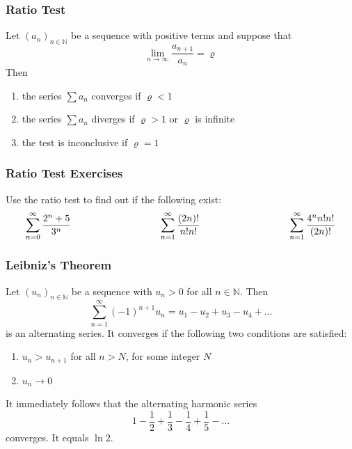 \documentclass[xcolor=dvipsnames]{beamer}
\begin{document}
\begin{frame}
  \frametitle{Ratio Test}
Let $\left(a_{n}\right)_{n\in\mathbb{N}}$ be a sequence with
positive terms and suppose that
\begin{equation}
  \label{eq:lahyaxee}
  \lim_{n\rightarrow\infty}\frac{a_{n+1}}{a_{n}}=\varrho
\end{equation}
Then
\begin{enumerate}
\item the series $\sum{}a_{n}$ converges if $\varrho<1$
\item the series $\sum{}a_{n}$ diverges if $\varrho>1$ or
  $\varrho$ is infinite
\item the test is inconclusive if $\varrho=1$
\end{enumerate}
\end{frame}

\begin{frame}
  \frametitle{Ratio Test Exercises}
  {\ubung} Use the ratio test to find out if the following exist:
  \begin{equation}
    \label{eq:uaxahphe}
    \begin{array}{ccccc}
      \displaystyle \sum_{n=0}^{\infty}\frac{2^{n}+5}{3^{n}} & \hspace{1in} & \displaystyle \sum_{n=1}^{\infty}\frac{(2n)!}{n!n!} & \hspace{1in} & \displaystyle \sum_{n=1}^{\infty}\frac{4^{n}n!n!}{(2n)!} \\
    \end{array}\notag
  \end{equation}
\end{frame}

\begin{frame}
  \frametitle{Leibniz's Theorem}
  Let $\left(u_{n}\right)_{n\in\mathbb{N}}$ be a sequence with
  $u_{n}>0$ for all $n\in\mathbb{N}$. Then
  \begin{equation}
    \label{eq:aegeigho}
    \sum_{n=1}^{\infty}(-1)^{n+1}u_{n}=u_{1}-u_{2}+u_{3}-u_{4}+{\ldots}
  \end{equation}
is an \alert{alternating series}. It converges if the
following two conditions are satisfied:
\begin{enumerate}
\item $u_{n}>u_{n+1}$ for all $n>N$, for some integer $N$
\item $u_{n}\longrightarrow{}0$
\end{enumerate}
It immediately follows that the alternating harmonic series
\begin{equation}
  \label{eq:aighuhif}
  1-\frac{1}{2}+\frac{1}{3}-\frac{1}{4}+\frac{1}{5}-{\ldots}
\end{equation}
converges. It equals $\ln{}2$.
\end{frame}
\end{document}

